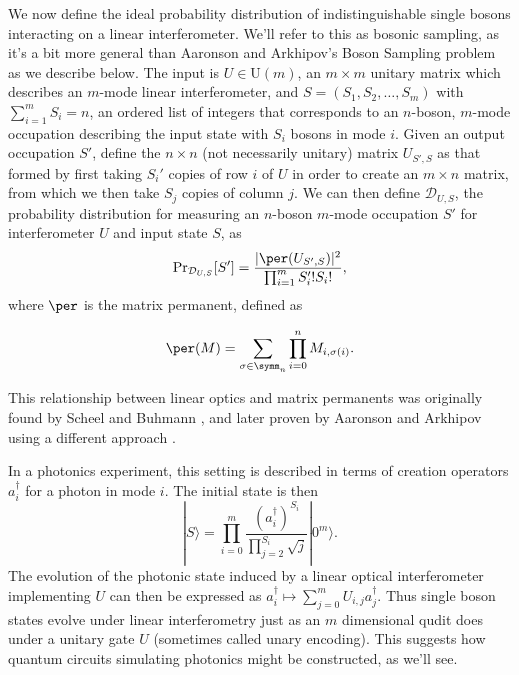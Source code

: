 We now define the ideal probability distribution of indistinguishable single bosons interacting on a linear interferometer.
We'll refer to this as bosonic sampling, as it's a bit more general than Aaronson and Arkhipov's Boson Sampling problem as we describe below.
The input is $U \in \mathrm{U}(m)$, an $m\times m$ unitary matrix which describes an $m$-mode linear interferometer, and $S = (S_1,S_2,\dots,S_m)$ with $\sum_{i=1}^m S_i =n$, an ordered list of integers that corresponds to an $n$-boson, $m$-mode occupation describing the input state with $S_i$ bosons in mode $i$. 
Given an output occupation $S'$, define the $n \times n$ (not necessarily unitary) matrix $U_{S',S}$ as that formed by first taking $S_i'$ copies of row $i$ of $U$ in order to create an $m\times n$ matrix, from which we then take $S_j$ copies of column $j$. 
We can then define $\mathcal{D}_{U,S}$, the probability distribution for measuring an $n$-boson $m$-mode occupation $S'$ for interferometer $U$ and input state $S$, as
\begin{equation}\label{eqn:bs-distribution}
\textrm{Pr}_{\mathcal{D}_{U,S}}[S'] = \frac{|\per(U_{S',S})|^2}{\prod_{i=1}^m S_i'! S_i!} ,
\end{equation}
where $\per$ is the matrix permanent, defined as

\begin{equation}
\per(M) = \sum_{\sigma\in\symm_n}\prod_{i=0}^nM_{i,\sigma(i)}.
\end{equation}

This relationship between linear optics and matrix permanents was originally found by Scheel and Buhmann \cite{scheel2008}, and later proven by Aaronson and Arkhipov using a different approach \cite{aaronson2010, aaronson2011}.

In a photonics experiment, this setting is described in terms of creation operators $a^\dag_i$ for a photon in mode $i$. 
The initial state is then
\begin{equation}
|S\rangle = \prod_{i=0}^m \frac{(a_i^\dagger)^{S_i}}{\prod_{j=2}^{S_i}\sqrt{j}}|0^m\rangle.
\end{equation}
The evolution of the photonic state induced by a linear optical interferometer implementing $U$ can then be expressed as $a_i^\dagger \mapsto \sum_{j = 0}^m U_{i,j}a_j^\dagger$.
Thus single boson states evolve under linear interferometry just as an $m$ dimensional qudit does under a unitary gate $U$ (sometimes called unary encoding).
This suggests how quantum circuits simulating photonics might be constructed, as we'll see.

